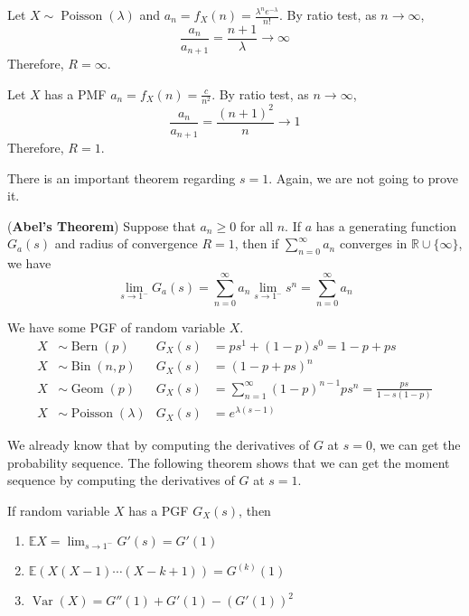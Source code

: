 \documentclass{huhtakm-template-book}
\newcommand{\expect}{\mathbb{E}}
\DeclareMathOperator{\Bern}{Bern}
\DeclareMathOperator{\Bin}{Bin}
\DeclareMathOperator{\Geom}{Geom}
\DeclareMathOperator{\Poisson}{Poisson}
\DeclareMathOperator{\Var}{Var}
\begin{document}
\newpage
\begin{eg}
	Let $X\sim\Poisson(\lambda)$ and  $a_{n}=f_{X}(n)=\frac{\lambda^{n}e^{-\lambda}}{n!}$. By ratio test, as $n\to\infty$,
	\begin{equation*}
		\frac{a_{n}}{a_{n+1}}=\frac{n+1}{\lambda}\to\infty
	\end{equation*}
	Therefore, $R=\infty$.
\end{eg}
\begin{eg}
	Let $X$ has a PMF $a_{n}=f_{X}(n)=\frac{c}{n^{2}}$. By ratio test, as $n\to\infty$,
	\begin{equation*}
		\frac{a_{n}}{a_{n+1}}=\frac{(n+1)^{2}}{n}\to 1
	\end{equation*}
	Therefore, $R=1$.
\end{eg}
There is an important theorem regarding $s=1$. Again, we are not going to prove it.
\begin{thm}(\textbf{Abel's Theorem})
	Suppose that $a_{n}\geq 0$ for all $n$. If $a$ has a generating function $G_{a}(s)$ and radius of convergence $R=1$, then if $\sum_{n=0}^{\infty}a_{n}$ converges in $\mathbb{R}\cup\{\infty\}$, we have
	\begin{equation*}
		\lim_{s\to 1^{-}}G_{a}(s)=\sum_{n=0}^{\infty}a_{n}\lim_{s\to 1^{-}}s^{n}=\sum_{n=0}^{\infty}a_{n}
	\end{equation*}
\end{thm}
\begin{eg}
	We have some PGF of random variable $X$.
	\begin{align*}
		X&\sim\Bern(p) & G_{X}(s)&=ps^{1}+(1-p)s^{0}=1-p+ps\\
		X&\sim\Bin(n,p) & G_{X}(s)&=(1-p+ps)^{n}\\
		X&\sim\Geom(p) & G_{X}(s)&=\sum_{n=1}^{\infty}(1-p)^{n-1}ps^{n}=\frac{ps}{1-s(1-p)}\\
		X&\sim\Poisson(\lambda) & G_{X}(s)&=e^{\lambda(s-1)}
	\end{align*}
\end{eg}
We already know that by computing the derivatives of $G$ at $s=0$, we can get the probability sequence. The following theorem shows that we can get the moment sequence by computing the derivatives of $G$ at $s=1$.
\begin{thm}
	If random variable $X$ has a PGF $G_{X}(s)$, then
	\begin{enumerate}
		\item $\expect X=\lim_{s\to 1^{-}}G'(s)=G'(1)$
		\item $\expect(X(X-1)\cdots(X-k+1))=G^{(k)}(1)$
		\item $\Var(X)=G''(1)+G'(1)-(G'(1))^{2}$
	\end{enumerate}
\end{thm}
\end{document}
